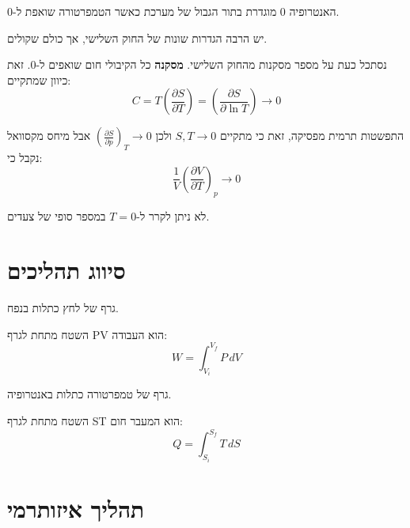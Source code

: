 \documentclass{tstextbook}
\begin{document}
\begin{theorem}
האנטרופיה 0 מוגדרת בתור הגבול של מערכת כאשר הטמפרטורה שואפת ל-0.

\end{theorem}
\begin{remark}
יש הרבה הגדרות שונות של החוק השלישי, אך כולם שקולים.

\end{remark}
נסתכל כעת על מספר מסקנות מהחוק השלישי.
\textbf{מסקנה}
כל הקיבולי חום שואפים ל-0. זאת כיוון שמתקיים:
$$C=T\left({\frac{\partial S}{\partial T}}\right)=\left({\frac{\partial S}{\partial\ln T}}\right)\rightarrow 0$$

\begin{corollary}
התפשטות תרמית מפסיקה, זאת כי מתקיים \(S,T\to 0\) ולכן \(\left(\frac{\partial S}{\partial p}\right)_{T}\rightarrow0\) אבל מיחס מקסוואל נקבל כי:
$$\frac{1}{V}\left(\frac{\partial V}{\partial T}\right)_{p}\rightarrow0$$

\end{corollary}
\begin{corollary}
לא ניתן לקרר ל-\(T=0\) במספר סופי של צעדים.

\end{corollary}

\section{סיווג תהליכים}

\begin{definition}[גרף PV]
גרף של לחץ כתלות בנפח.

\end{definition}
\begin{proposition}
השטח מתחת לגרף PV הוא העבודה:
$$W=\int_{V_{i}}^{V_{f}}P\,d V$$

\end{proposition}
\begin{definition}[גרף ST]
גרף של טמפרטורה כתלות באנטרופיה.

\end{definition}
\begin{proposition}
השטח מתחת לגרף ST הוא המעבר חום:
$$Q=\int_{S_{i}}^{S_{f}}T\,d S$$

\end{proposition}
\section{תהליך איזותרמי}
\end{document}
